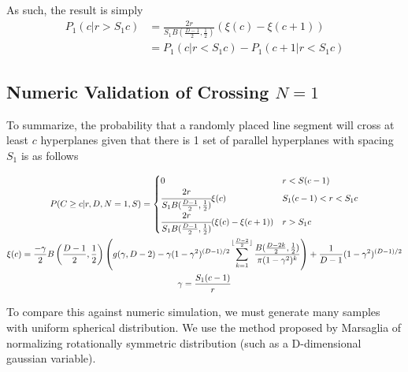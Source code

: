 \documentclass{article}
\begin{document}
As such, the result is simply
\begin{align}
	P_1(c | r>S_1c) &= \frac{2r}{S_1 B(\frac{D-1}{2}, \frac{1}{2})} (\xi(c) - \xi(c+1)) \\
	&= P_1(c | r<S_1c) - P_1(c+1 | r<S_1c)
\end{align}


\subsection{Numeric Validation of Crossing $N=1$} \label{s:n=1 numeric}
To summarize, the probability that a randomly placed line segment will cross at least $c$
hyperplanes given that there is 1 set of parallel hyperplanes with spacing $S_1$ is as follows

\begin{gather}
	P(C\ge c | r, D, N=1, S) = \begin{cases}
		0 & r < S(c-1) \\ 
		\cfrac{2r}{S_1 B(\frac{D-1}{2}, \frac{1}{2})} \xi(c)  & S_1 (c-1) < r < S_1 c \\
		\cfrac{2r}{S_1 B(\frac{D-1}{2}, \frac{1}{2})} (\xi(c)-\xi(c+1)) & r > S_1c		
	\end{cases} \\
	\xi(c) = \frac{-\gamma}{2}B\left(\frac{D-1}{2}, \frac{1}{2}\right)\left(g(\gamma, D-2)-\gamma(1-\gamma^2)^{(D-1)/2}\sum_{k=1}^{\lfloor \frac{D-2}{2} \rfloor}\frac{B(\frac{D-2k}{2}, \frac{1}{2})}{\pi(1-\gamma^2)^k}\right) + \frac{1}{D-1}(1-\gamma^2)^{(D-1)/2} \\
	\gamma = \frac{S_1(c-1)}{r} 
\end{gather}

To compare this against numeric simulation, we must generate many samples with uniform spherical
distribution. We use the method proposed by Marsaglia of normalizing rotationally symmetric
distribution (such as a D-dimensional gaussian variable).
\end{document}
